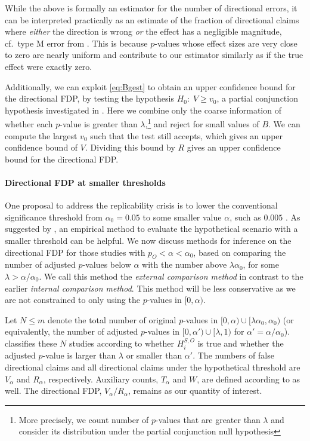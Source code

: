 \documentclass[11pt]{article}
\theoremstyle{definition}
\theoremstyle{custom}
\newcommand{\ao}{\alpha_0}
\begin{document}
  While the above is formally an estimator for the number of directional errors, it can be interpreted practically as an estimate of the fraction of directional claims where {\em either} the direction is wrong {\em or} the effect has a negligible magnitude, cf.\ type M error from \citet{Gelman:2014cd}. This is because $p$-values whose effect sizes are very close to zero are nearly uniform and contribute to our estimator similarly as if the true effect were exactly zero.

  Additionally, we can exploit \eqref{eq:Bgest} to obtain an upper confidence bound for the directional FDP, by testing the hypothesis $H_0:\; V \ge v_0$, a partial conjunction hypothesis investigated in \citet{Heller:2007}. Here we combine only the coarse information of whether each $p$-value is greater than $\lambda$,\footnote{More precisely, we count number of $p$-values that are greater than $\lambda$ and consider its distribution under the partial conjunction null hypothesis} and reject for small values of $B$. We can compute the largest $v_0$ such that the test still accepts, which gives an upper confidence bound of $V$. Dividing this bound by $R$ gives an upper confidence bound for the directional FDP.

  \paragraph{Directional FDP at smaller thresholds} One proposal to address the replicability crisis is to lower the conventional significance threshold from $\ao=0.05$ to some smaller value $\alpha$, such as $0.005$ \citep{Benjamin:2018gh}. As suggested by \citet{Goodman:2013kj}, an empirical method to evaluate the hypothetical scenario with a smaller threshold can be helpful. We now discuss methods for inference on the directional FDP for those studies with $p_O < \alpha < \ao$, based on comparing the number of adjusted $p$-values below $\alpha$ with the number above $\lambda\ao$, for some $\lambda > \alpha/\ao$. We call this method the {\em external comparison method} in contrast to the earlier {\em internal comparison method}. This method will be less conservative as we are not constrained to only using the $p$-values in $[0, \alpha)$.
  
  Let $N \le m$ denote the total number of original $p$-values in $[0,\alpha) \cup [\lambda\ao, \ao)$ (or equivalently, the number of adjusted $p$-values in $[0,\alpha') \cup [\lambda, 1)$ for $\alpha' = \alpha/\ao$).  classifies these $N$ studies according to whether $H_i^{S,O}$ is true and whether the adjusted $p$-value is larger than $\lambda$ or smaller than $\alpha'$. The numbers of false directional claims and all directional claims under the hypothetical threshold are $V_\alpha$ and $R_\alpha$, respectively. Auxiliary counts, $T_\alpha$ and $W$, are defined according to  as well. The directional FDP, $V_\alpha / R_\alpha$, remains as our quantity of interest.
  
\end{document}

